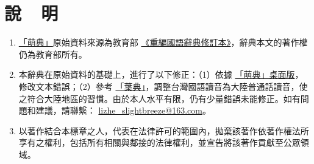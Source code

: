 \specialsectioning
\chapter{說\ \ 明}
\begin{enumerate}[leftmargin=*]
\setlength{\itemsep}{10pt}
\item \href{https://www.moedict.tw}{「萌典」}原始資料來源為教育部
\href{http://dict.revised.moe.edu.tw/cbdic/index.html}{《重編國語辭典修訂本》}，辭典本文的著作權仍為教育部所有。

\item 本辭典在原始資料的基礎上，進行了以下修正：（1）依據 \href{https://racklin.github.io/moedict-desktop/download.html}{「萌典」桌面版}，修改文本錯誤；（2）參考 \href{http://yedict.com/}{「葉典」}，調整台灣國語讀音為大陸普通話讀音，使之符合大陸地區的習慣。由於本人水平有限，仍有少量錯誤未能修正。如有問題和建議，請聯繫： \href{mailto:lizhe_slightbreeze@163.com}{lizhe\_slightbreeze@163.com}。

\item 以著作結合本標章之人，代表在法律許可的範圍內，拋棄該著作依著作權法所享有之權利，包括所有相關與鄰接的法律權利，並宣告將該著作貢獻至公眾領域。
\end{enumerate} 